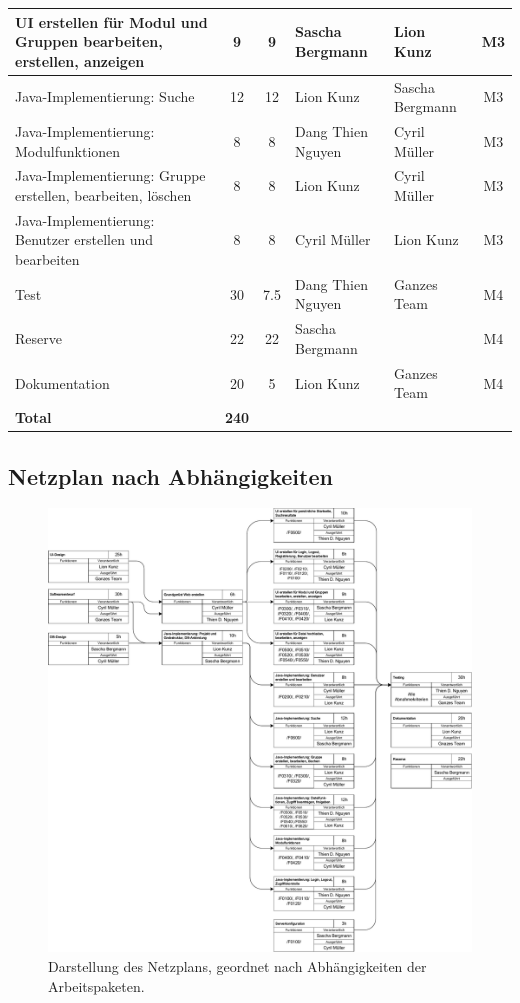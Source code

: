 \begin{landscape}
\begin{tabularx}{\linewidth}{|X|c|c|l|l|c|}
UI erstellen für Modul und Gruppen bearbeiten, erstellen, anzeigen		&	9	&	9	&	Sascha Bergmann	&	Lion Kunz&	M3\\ \hline
Java-Implementierung: Suche 											&	12	&	12	&	Lion Kunz		&	Sascha Bergmann&	M3\\ \hline
Java-Implementierung: Modulfunktionen 									&	8	&	8	&	Dang Thien Nguyen&	Cyril Müller&	M3\\ \hline
Java-Implementierung: Gruppe erstellen, bearbeiten, löschen 			&	8	&	8	&	Lion Kunz		&	Cyril Müller&	M3\\ \hline
Java-Implementierung: Benutzer erstellen und bearbeiten 				&	8	&	8	&	Cyril Müller	&	Lion Kunz&	M3\\ \hline
Test 																	&	30	&	7.5	&	Dang Thien Nguyen&	Ganzes Team&	M4\\ \hline
Reserve 																&	22	&	22	&	Sascha Bergmann	&	&	M4\\ \hline
Dokumentation 															&	20	&	5	&	Lion Kunz		&	Ganzes Team&	M4\\ \hline
\textbf{Total}																	&	\textbf{240}	&		&	&	&	\\ \hline
\end{tabularx}
\end{landscape}


\subsection{Netzplan nach Abhängigkeiten}
\begin{figure}[H]
\includegraphics[width=1.1\linewidth]{graphics/netzplan_s1.pdf}
\caption{Darstellung des Netzplans, geordnet nach Abhängigkeiten der Arbeitspaketen.}
\end{figure}